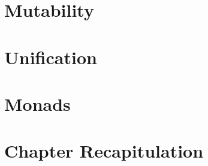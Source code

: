 \documentclass[thesis-solanki.tex]{subfiles}
\begin{document}
\section{Mutability}





\section{Unification}



\section{ Monads}





\section{Chapter Recapitulation}
\end{document}
